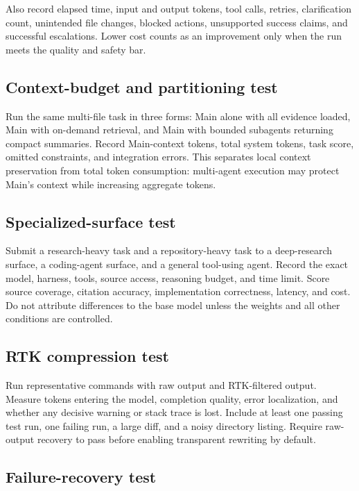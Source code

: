 \documentclass[11pt,a4paper]{article}
\begin{document}
Also record elapsed time, input and output tokens, tool calls, retries, clarification count, unintended file changes, blocked actions, unsupported success claims, and successful escalations. Lower cost counts as an improvement only when the run meets the quality and safety bar.

\subsection{Context-budget and partitioning test}

Run the same multi-file task in three forms: Main alone with all evidence loaded, Main with on-demand retrieval, and Main with bounded subagents returning compact summaries. Record Main-context tokens, total system tokens, task score, omitted constraints, and integration errors. This separates local context preservation from total token consumption: multi-agent execution may protect Main's context while increasing aggregate tokens.

\subsection{Specialized-surface test}

Submit a research-heavy task and a repository-heavy task to a deep-research surface, a coding-agent surface, and a general tool-using agent. Record the exact model, harness, tools, source access, reasoning budget, and time limit. Score source coverage, citation accuracy, implementation correctness, latency, and cost. Do not attribute differences to the base model unless the weights and all other conditions are controlled.

\subsection{RTK compression test}

Run representative commands with raw output and RTK-filtered output. Measure tokens entering the model, completion quality, error localization, and whether any decisive warning or stack trace is lost. Include at least one passing test run, one failing run, a large diff, and a noisy directory listing. Require raw-output recovery to pass before enabling transparent rewriting by default.

\subsection{Failure-recovery test}
\end{document}
